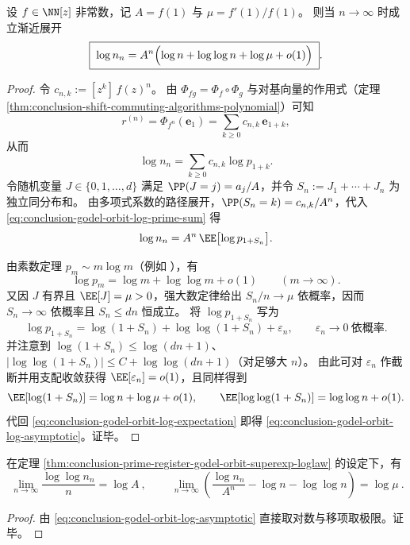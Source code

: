 \begin{theorem}\label{thm:conclusion-prime-register-godel-orbit-superexp-loglaw}
设 \(f\in\NN[z]\) 非常数，记 \(A=f(1)\) 与 \(\mu=f'(1)/f(1)\)。
则当 \(n\to\infty\) 时成立渐近展开
\begin{equation}\label{eq:conclusion-godel-orbit-log-asymptotic}
\boxed{\;
\log n_n
=A^{n}\Bigl(\log n+\log\log n+\log \mu+o(1)\Bigr)\; }.
\end{equation}
\end{theorem}
\begin{proof}
令 \(c_{n,k}:=[z^k]\,f(z)^n\)。
由 \(\Phi_{fg}=\Phi_f\circ\Phi_g\) 与对基向量的作用式（定理 \ref{thm:conclusion-shift-commuting-algorithms-polynomial}）可知
\[
r^{(n)}=\Phi_{f^n}(\mathbf e_1)=\sum_{k\ge 0}c_{n,k}\,\mathbf e_{1+k},
\]
从而
\begin{equation}\label{eq:conclusion-godel-orbit-log-prime-sum}
\log n_n=\sum_{k\ge 0}c_{n,k}\log p_{1+k}.
\end{equation}
令随机变量 \(J\in\{0,1,\dots,d\}\) 满足 \(\PP(J=j)=a_j/A\)，并令 \(S_n:=J_1+\cdots+J_n\) 为独立同分布和。
由多项式系数的路径展开，\(\PP(S_n=k)=c_{n,k}/A^n\)，代入 \eqref{eq:conclusion-godel-orbit-log-prime-sum} 得
\begin{equation}\label{eq:conclusion-godel-orbit-log-expectation}
\log n_n=A^n\,\EE\bigl[\log p_{1+S_n}\bigr].
\end{equation}

由素数定理 \(p_m\sim m\log m\)（例如 \cite{Apostol1976}），有
\[
\log p_m=\log m+\log\log m+o(1)\qquad(m\to\infty).
\]
又因 \(J\) 有界且 \(\EE[J]=\mu>0\)，强大数定律给出 \(S_n/n\to\mu\) 依概率，因而 \(S_n\to\infty\) 依概率且 \(S_n\le dn\) 恒成立。
将 \(\log p_{1+S_n}\) 写为
\[
\log p_{1+S_n}=\log(1+S_n)+\log\log(1+S_n)+\varepsilon_n,
\qquad
\varepsilon_n\to 0\ \text{依概率}.
\]
并注意到 \(\log(1+S_n)\le \log(dn+1)\)、\(|\log\log(1+S_n)|\le C+\log\log(dn+1)\)（对足够大 \(n\)）。
由此可对 \(\varepsilon_n\) 作截断并用支配收敛获得 \(\EE[\varepsilon_n]=o(1)\)，且同样得到
\[
\EE[\log(1+S_n)]=\log n+\log\mu+o(1),
\qquad
\EE[\log\log(1+S_n)]=\log\log n+o(1).
\]
代回 \eqref{eq:conclusion-godel-orbit-log-expectation} 即得 \eqref{eq:conclusion-godel-orbit-log-asymptotic}。证毕。
\end{proof}

\begin{corollary}[双对数线性化与参数可识别性]\label{cor:conclusion-godel-orbit-identifiability}
在定理 \ref{thm:conclusion-prime-register-godel-orbit-superexp-loglaw} 的设定下，有
\[
\boxed{\ \lim_{n\to\infty}\frac{\log\log n_n}{n}=\log A\ },
\qquad
\boxed{\ \lim_{n\to\infty}\left(\frac{\log n_n}{A^n}-\log n-\log\log n\right)=\log\mu\ }.
\]
\end{corollary}
\begin{proof}
由 \eqref{eq:conclusion-godel-orbit-log-asymptotic} 直接取对数与移项取极限。证毕。
\end{proof}

